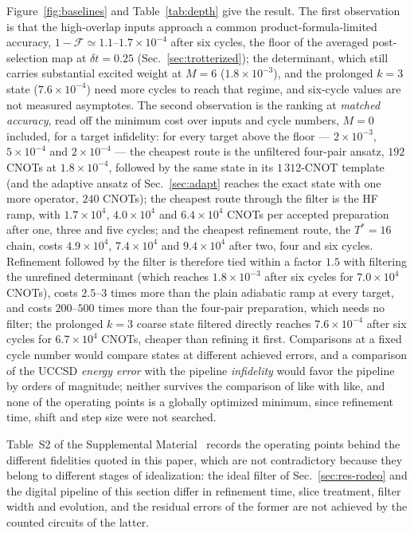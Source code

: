\documentclass[
  aps,            %
  prc,            %
  reprint,        %
  superscriptaddress,
  floatfix,
  nofootinbib
]{revtex4-2}
\newcommand{\SM}{Supplemental Material~\cite{SM}}
\begin{document}
Figure~\ref{fig:baselines} and Table~\ref{tab:depth} give the result.  The
first observation is that the high-overlap inputs approach a common
product-formula-limited accuracy, $1-\mathcal F\simeq1.1$--$1.7\times10^{-4}$
after six cycles, the floor of the averaged post-selection map at
$\delta t=0.25$ (Sec.~\ref{sec:trotterized}); the determinant, which still
carries substantial excited weight at $M=6$ ($1.8\times10^{-3}$), and the
prolonged $k=3$ state ($7.6\times10^{-4}$) need more cycles to reach that
regime, and six-cycle values are not measured asymptotes.  The second
observation is the ranking at \emph{matched accuracy}, read off the minimum
cost over inputs and cycle numbers, $M=0$ included, for a target
infidelity: for every target above the floor --- $2\times10^{-3}$,
$5\times10^{-4}$ and $2\times10^{-4}$ --- the cheapest route is the
unfiltered four-pair ansatz, $192$ CNOTs at $1.8\times10^{-4}$, followed by
the same state in its $1\,312$-CNOT template (and the adaptive ansatz of
Sec.~\ref{sec:adapt} reaches the exact state with one more operator, $240$
CNOTs); the cheapest route through the
filter is the HF ramp, with $1.7\times10^{4}$, $4.0\times10^{4}$ and
$6.4\times10^{4}$ CNOTs per accepted preparation after one, three and five
cycles; and the cheapest refinement route, the $T^{*}=16$ chain, costs
$4.9\times10^{4}$, $7.4\times10^{4}$ and $9.4\times10^{4}$ after two, four
and six cycles.  Refinement followed by the filter is therefore tied within a
factor $1.5$ with filtering the unrefined determinant (which reaches
$1.8\times10^{-3}$ after six cycles for $7.0\times10^{4}$ CNOTs), costs
$2.5$--$3$ times more than the plain adiabatic ramp at every target, and
costs $200$--$500$ times more than the four-pair preparation, which needs no
filter; the prolonged $k=3$ coarse state filtered directly reaches
$7.6\times10^{-4}$ after six cycles for $6.7\times10^{4}$ CNOTs, cheaper
than refining it first.  Comparisons at a fixed cycle number would compare
states at different achieved errors, and a comparison of the UCCSD
\emph{energy error} with the pipeline \emph{infidelity} would favor the
pipeline by orders of magnitude; neither survives the comparison of like
with like, and none of the operating points is a globally optimized
minimum, since refinement time, shift and step size were not searched.

Table~S2 of the \SM{} records the operating points behind the different
fidelities quoted in this paper, which are not contradictory because they
belong to different stages of idealization: the ideal filter of
Sec.~\ref{sec:res-rodeo} and the digital pipeline of this section differ in
refinement time, slice treatment, filter width and evolution, and the residual
errors of the former are not achieved by the counted circuits of the latter.
\end{document}
